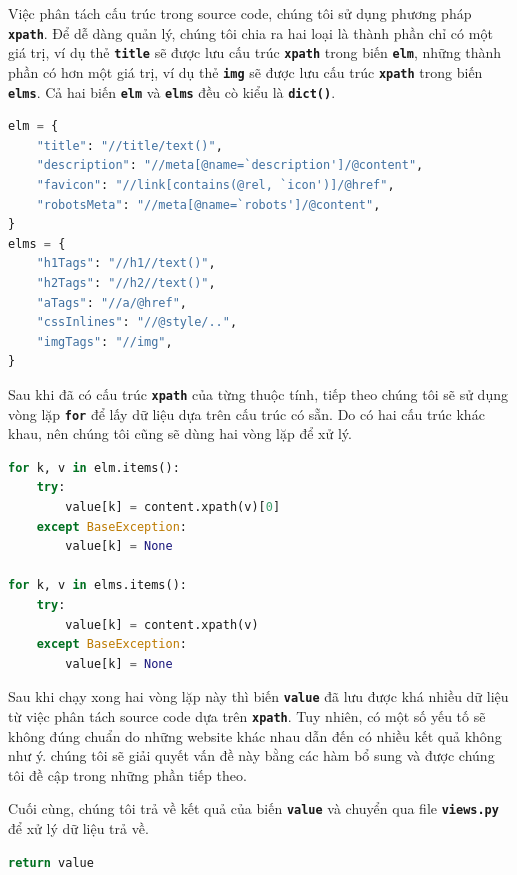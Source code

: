 \par
Việc phân tách cấu trúc trong source code, chúng tôi sử dụng phương pháp \textbf{\texttt{xpath}}. Để dễ dàng quản lý, chúng tôi chia ra hai loại là thành phần chỉ có một giá trị, ví dụ thẻ \textbf{\texttt{title}} sẽ được lưu cấu trúc \textbf{\texttt{xpath}} trong biến \textbf{\texttt{elm}}, những thành phần có hơn một giá trị, ví dụ thẻ \textbf{\texttt{img}} sẽ được lưu cấu trúc \textbf{\texttt{xpath}} trong biến \textbf{\texttt{elms}}. Cả hai biến \textbf{\texttt{elm}} và \textbf{\texttt{elms}} đều cò kiểu là \textbf{\texttt{dict()}}.
\begin{lstlisting}[language=Python]
elm = {
    "title": "//title/text()",
    "description": "//meta[@name=`description']/@content",
    "favicon": "//link[contains(@rel, `icon')]/@href",
    "robotsMeta": "//meta[@name=`robots']/@content",
}
elms = {
    "h1Tags": "//h1//text()",
    "h2Tags": "//h2//text()",
    "aTags": "//a/@href",
    "cssInlines": "//@style/..",
    "imgTags": "//img",
}
\end{lstlisting}
\par
Sau khi đã có cấu trúc \textbf{\texttt{xpath}} của từng thuộc tính, tiếp theo chúng tôi sẽ sử dụng vòng lặp \textbf{\texttt{for}} để lấy dữ liệu dựa trên cấu trúc có sẵn. Do có hai cấu trúc khác khau, nên chúng tôi cũng sẽ dùng hai vòng lặp để xử lý.
\begin{lstlisting}[language=Python]
for k, v in elm.items():
    try:
        value[k] = content.xpath(v)[0]
    except BaseException:
        value[k] = None

for k, v in elms.items():
    try:
        value[k] = content.xpath(v)
    except BaseException:
        value[k] = None
\end{lstlisting}
\par
Sau khi chạy xong hai vòng lặp này thì biến \textbf{\texttt{value}} đã lưu được khá nhiều dữ liệu từ việc phân tách source code dựa trên \textbf{\texttt{xpath}}. Tuy nhiên, có một số yếu tố sẽ không đúng chuẩn do những website khác nhau dẫn đến có nhiều kết quả không như ý. chúng tôi sẽ giải quyết vấn đề này bằng các hàm bổ sung và được chúng tôi đề cập trong những phần tiếp theo.
\par
Cuối cùng, chúng tôi trả về kết quả của biến \textbf{\texttt{value}} và chuyển qua file \textbf{\texttt{views.py}} để xử lý dữ liệu trả về.
\begin{lstlisting}[language=Python]
return value
\end{lstlisting}
\par
